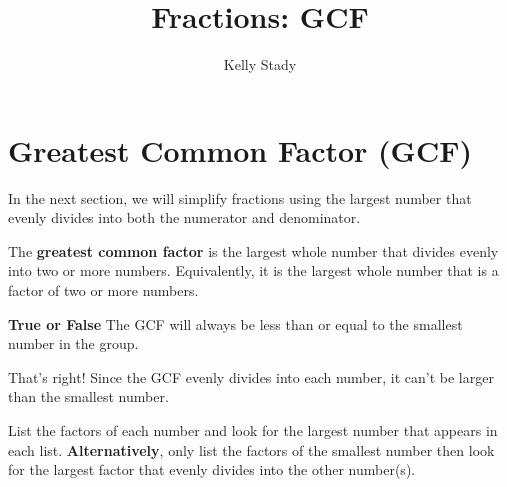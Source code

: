 \documentclass{ximera}[font=12pt]  %
\title{Fractions: GCF}   %
\author{Kelly Stady}
\begin{document}
\begin{abstract}

\end{abstract}

\maketitle

\label{xim:FracsGCFSimplify}


\section*{Greatest Common Factor (GCF)}

In the next section, we will simplify fractions using the largest number that evenly divides into both the numerator and denominator. 

\begin{definition}
The \textbf{greatest common factor} is the largest whole number that divides evenly into two or more numbers.  Equivalently, it is
the largest whole number that is a factor of two or more numbers.

\end{definition}


\begin{problem} \textcolor{accessibleOrange}{\textbf{True or False}}  The GCF will always be less than or equal to the smallest 
    number in the group.

\begin{multipleChoice}
\end{multipleChoice}

\begin{feedback}[correct]
That's right!  Since the GCF evenly divides into each number, it can't be larger than the smallest number.
\end{feedback}

\end{problem}


\begin{procedure}

List the factors of each number and look for the largest number that appears in each list.  \textbf{Alternatively}, 
only list the factors of the smallest number then look for the largest factor that evenly divides into the other number(s).

\end{procedure}
\end{document}
